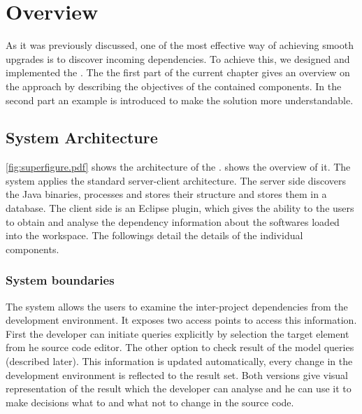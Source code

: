 \chapter{Overview}

As it was previously discussed, one of the most effective  way of achieving
smooth upgrades is to discover incoming dependencies. To achieve this, we
designed and implemented the \ptool{}. The the first part of the current chapter
gives an overview on the \ptool{} approach by describing the objectives of the
contained components. In the second part an example is introduced to make the
solution more understandable. 


\section{System Architecture}

\autoref{fig:superfigure.pdf}  shows the architecture of the \ptool{}.
shows the overview of it. The system applies the standard server-client
architecture. The server side discovers the Java binaries, processes and stores
their structure and stores them in a database. The client side is an Eclipse
plugin, which gives the ability to the users to obtain and analyse the
dependency information about the softwares loaded into the workspace. The followings
detail the details of the individual components.


\subsection{System boundaries}
The system allows the users to examine the inter-project dependencies from the
development environment. It exposes two access points to access this
information. First the developer can initiate queries explicitly by selection
the target element from  he source code editor. The other option to check result
of the model queries (described later). This information is updated
automatically, every change in the development environment is reflected to the
result set. Both versions give visual representation of the result which the
developer can analyse and he can use it to make decisions what to and what not
to change in the source code.


